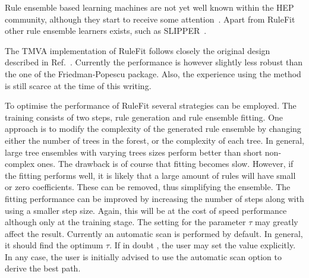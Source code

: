 Rule ensemble based learning machines are not yet well known within the
HEP community, although they start to receive some
attention~\cite{RuleSusy}. Apart from RuleFit~\cite{RuleFit}
other rule ensemble learners exists, such as SLIPPER~\cite{SLIPPER}.

The TMVA implementation of RuleFit follows closely the original design
described in Ref.~\cite{RuleFit}. Currently the performance is however slightly
less robust than the one of the Friedman-Popescu package. Also, the experience 
using the method is still scarce at the time of this writing.

To optimise the performance of RuleFit several
strategies can be employed.  The training consists of two steps, rule
generation and rule ensemble fitting. One approach is to modify the
complexity of the generated rule ensemble by changing either the
number of trees in the forest, or the complexity of each tree. In general, 
large tree ensembles with varying trees sizes perform better than short non-complex
ones. The drawback is of course that fitting becomes slow.  However, if the
fitting performs well, it is likely that a large amount of rules will
have small or zero coefficients. These can be removed, thus
simplifying the ensemble. The fitting performance can be improved by 
increasing the number of steps along with using a smaller step size. Again, 
this will be at the cost of speed performance although only at the training stage.
The setting for the parameter $\tau$ may greatly affect the result. Currently 
an automatic scan is performed by default. In general, it should find the 
optimum $\tau$. If in doubt , the user may set the value explicitly.
In any case, the user is initially advised to use the automatic scan option to 
derive the best path.
